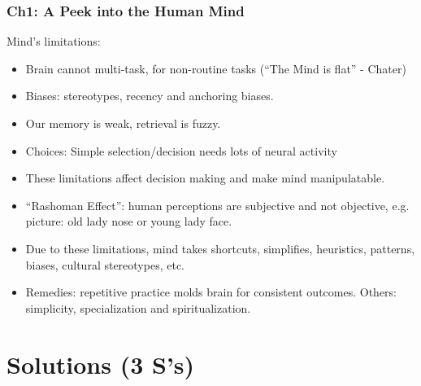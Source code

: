 \begin{frame}[fragile]\frametitle{Ch1: A Peek into the Human Mind}
Mind's limitations:
\begin{itemize}
\item Brain cannot multi-task, for non-routine tasks (``The Mind is flat'' - Chater)
\item Biases: stereotypes, recency and anchoring biases.
\item Our memory is weak, retrieval is fuzzy.
\item Choices: Simple selection/decision needs lots of neural activity
\item These limitations affect decision making and make mind manipulatable.
\item ``Rashoman Effect'': human perceptions are subjective and not objective, e.g. picture: old lady nose or young lady face.
\item Due to these limitations, mind takes shortcuts, simplifies, heuristics, patterns, biases, cultural stereotypes, etc.
\item Remedies: repetitive practice molds brain for consistent outcomes. Others: simplicity, specialization and spiritualization.
\end{itemize}

\end{frame}

\section{Solutions (3 S's)}

